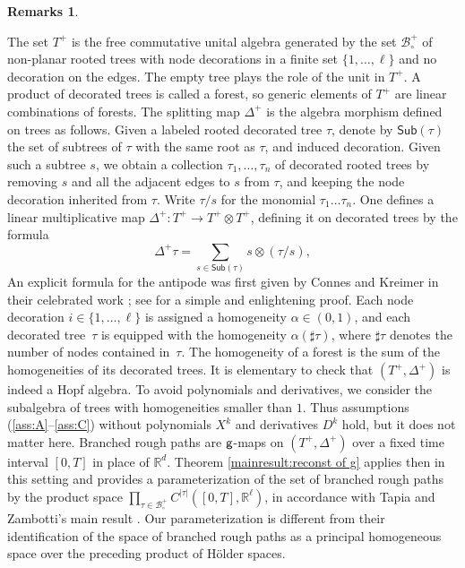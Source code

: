 \documentclass[JEP,XML,SOM,Unicode,published]{cedram}
\theoremstyle{plain}
\theoremstyle{definition}
\newtheorem*{remarks*} {Remarks}
\newcommand{\bbR}{\mathbb{R}}
\newcommand{\mcB}{\mathcal{B}}
\begin{document}
\begin{remarks*}
\begin{enumerate}
The set $T^+$ is the free commutative unital algebra generated by the set $\mcB^+_\circ$ of non-planar rooted trees with node decorations in a finite set $\{1,\dots,\ell\}$ and no decoration on the edges. The empty tree plays the role of the unit in $T^+$. A product of decorated trees is called a forest, so generic elements of $T^+$ are linear combinations of forests. The splitting map $\Delta^+$ is the algebra morphism defined on trees as follows. Given a labeled rooted decorated tree $\tau$, denote by $\textsf{Sub}(\tau)$ the set of subtrees of $\tau$ with the same root as $\tau$, and induced decoration. Given such a subtree $s$, we obtain a collection $\tau_1,\dots,\tau_n$ of decorated rooted trees by removing $s$ and all the adjacent edges to $s$ from $\tau$, and keeping the node decoration inherited from $\tau$. Write $\tau/s$ for the monomial $\tau_1\dots\tau_n$. One defines a linear multiplicative map $\Delta^+ : T^+ \to T^+\otimes T^+$, defining it on decorated trees by the formula\vspace*{-3pt}
\[
\Delta^+\tau = \sum_{s\in\textsf{Sub}(\tau)} s\otimes (\tau/s),
\]
An explicit formula for the antipode was first given by Connes and Kreimer in their celebrated work \cite{CK}; see \cite{CHV} for a simple and enlightening proof. Each node decoration $i\in\{1,\dots,\ell\}$ is assigned a homogeneity $\alpha\in(0,1)$,
and each decorated tree~$\tau$ is equipped with the homogeneity $\alpha(\sharp\tau)$, where $\sharp\tau$ denotes the number of nodes \hbox{contained} in~$\tau$. The homogeneity of a forest is the sum of the homogeneities of its decorated trees. It is elementary to check that $(T^+,\Delta^+)$ is indeed a Hopf algebra. To avoid polynomials and derivatives, we consider the subalgebra of trees with homo\-geneities smaller than $1$. Thus assumptions (\ref{ass:A}--\ref{ass:C}) without polynomials $X^k$ and derivatives $D^k$ hold, but it does not matter here.
Branched rough paths are $\sf g$-maps on $(T^+,\Delta^+)$ over a fixed time interval $[0,T]$ in place of $\bbR^d$. Theorem \ref{mainresult:reconst of g} applies then in this setting and provides a parameterization of the set of branched rough paths by the product space $\prod_{\tau\in\mcB_\circ^+} C^{\vert\tau\vert}([0,T], \bbR^\ell)$, in accordance with Tapia and Zambotti's main result \cite[Th.\,1.2 \& Cor.\,1.3]{TZ18}. Our parameterization is different from their identification of the space of branched rough paths as a principal homogeneous space over the preceding product of Hölder spaces.


\end{enumerate}
\end{remarks*}
\end{document}
